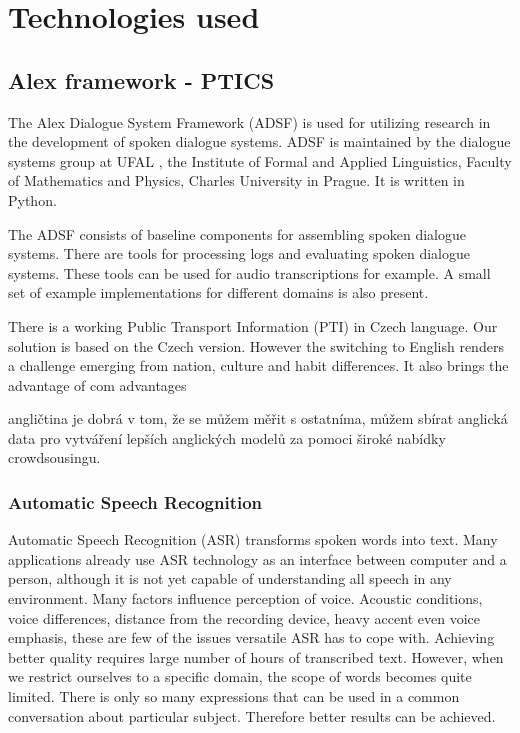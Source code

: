 \chapter{Technologies used}

\section{Alex framework - PTICS}

The Alex Dialogue System Framework (ADSF) is used for utilizing research in the development of spoken dialogue systems.
ADSF is maintained by the dialogue systems group at UFAL \cite{ufal}, the Institute of Formal and Applied Linguistics, Faculty of Mathematics and Physics, Charles University in Prague.
It is written in Python.

The ADSF consists of baseline components for assembling spoken dialogue systems.
There are tools for processing logs and evaluating spoken dialogue systems.
These tools can be used for audio transcriptions for example.
A small set of example implementations for different domains is also present.

There is a working Public Transport Information (PTI) \cite{ptics} in Czech language.
Our solution is based on the Czech version.
However the switching to English renders a challenge emerging from nation, culture and habit differences.
It also brings the advantage of com advantages 

angličtina je dobrá v tom, že se můžem měřit s ostatníma, můžem sbírat anglická data pro vytváření lepších anglických modelů za pomoci široké nabídky crowdsousingu. 


\subsection{Automatic Speech Recognition}

Automatic Speech Recognition (ASR) transforms spoken words into text.
Many applications already use ASR technology as an interface between computer and a person, although it is not yet capable of understanding all speech in any environment.
Many factors influence perception of voice.
Acoustic conditions, voice differences, distance from the recording device, heavy accent even voice emphasis, these are few of the issues versatile ASR has to cope with.
Achieving better quality requires large number of hours of transcribed text.
However, when we restrict ourselves to a specific domain, the scope of words becomes quite limited.
There is only so many expressions that can be used in a common conversation about particular subject.
Therefore better results can be achieved.

